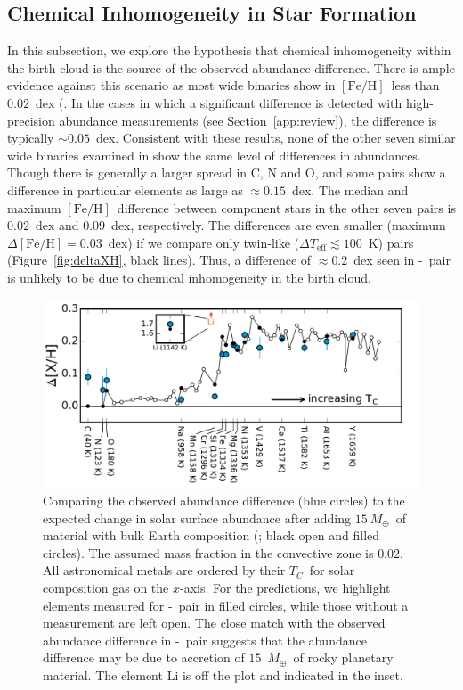 \documentclass[modern, letterpaper]{aastex61}
\newcommand{\sectionname}{Section}
\newcommand{\figname}{Figure}
\newcommand*\elem[1]{\ensuremath{\mathrm{#1}}}
\newcommand*\elemH[1]{\ensuremath{[\mathrm{#1}/\elem{H}]}}
\newcommand*{\feh}{\ensuremath{\elemH{Fe}}}
\newcommand{\sunanalog}{\text{Krios}}
\newcommand{\bizarreone}{\text{Kronos}}
\newcommand{\Tcondens}{\ensuremath{T_C}}
\newcommand{\mearth}{\ensuremath{M_\oplus}}
\newcommand{\maccreted}{\ensuremath{15~\mearth}}
\begin{document}
\subsection{Chemical Inhomogeneity in Star Formation}
\label{sub:chemical_inhomogeneity_in_star_formation}

In this subsection, we explore the hypothesis that chemical inhomogeneity
within the birth cloud is the source of the observed abundance difference.
There is ample evidence against this scenario as most wide binaries show in
\feh\ less than $0.02$~dex (\citealt{Desidera:2004aa,Gratton:2001aa}.
In the cases in which a significant difference is detected
with high-precision abundance measurements (see \sectionname~\ref{app:review}),
the difference is typically $\sim 0.05$~dex.
Consistent with these results,
none of the other seven similar wide binaries examined in
\citealt{2016ApJS..225...32B} show the same level of differences in abundances.
Though there is generally a larger spread in $\elem{C}$, $\elem{N}$ and
$\elem{O}$, and some pairs show a difference in particular elements as large as
$\approx 0.15$~dex.
The median and maximum \feh\ difference between component stars in the other
seven pairs is $0.02$~dex and $0.09$~dex, respectively.
The differences are even smaller (maximum $\Delta\feh = 0.03$~dex) if we
compare only twin-like ($\Delta T_\mathrm{eff} \lesssim 100$~K) pairs
(\figname~\ref{fig:deltaXH}, black lines).
Thus, a difference of $\approx 0.2$~dex seen in \bizarreone-\sunanalog\ pair is
unlikely to be due to chemical inhomogeneity in the birth cloud.

\begin{figure}[htpb]
  \centering
  \includegraphics[width=0.95\linewidth]{deltaxh_tcrank.pdf}
  \caption{
    Comparing the observed abundance difference (blue circles) to the expected
    change in solar surface abundance after adding \maccreted\ of material
    with bulk Earth composition (\citealt{2003TrGeo...2..547M}; black open and
    filled circles).
    The assumed mass fraction in the convective zone is $0.02$.
    All astronomical metals are ordered by their \Tcondens\ for solar
    composition gas on the $x$-axis.
    For the predictions, we highlight elements measured for \bizarreone-\sunanalog\ pair
    in filled circles, while those without a measurement are left open.
    The close match with the observed abundance difference in \bizarreone-\sunanalog\ pair
    suggests that the abundance difference may be due to accretion of
    $15$~\mearth\ of rocky planetary material.
    The element \elem{Li} is off the plot and indicated in the inset.
  }
  \label{fig:toycalc}
\end{figure}
\end{document}
